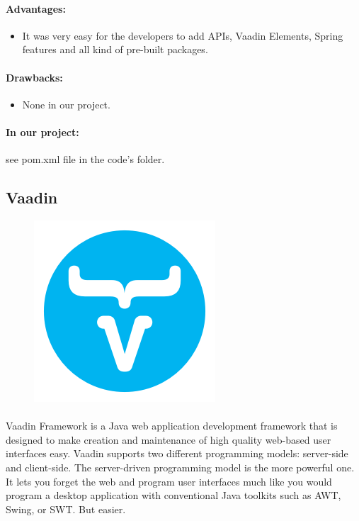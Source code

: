 \documentclass{article}
\begin{document}
		\paragraph{Advantages:}
		\begin{itemize}
			\item{}It was very easy for the developers to add APIs, Vaadin Elements, Spring features and all kind of pre-built packages.
		\end{itemize}
		\paragraph{Drawbacks:}
		\begin{itemize}
			\item{}None in our project.
		\end{itemize}
		\paragraph{In our project:}see pom.xml file in the code's folder.
	\subsection{Vaadin}
			\begin{figure}[H]
			\begin{center}
			\includegraphics[width=0.2\linewidth]{Images/Appendix/vaadin1.png}
			\label{fig:V1}
			\end{center}
			\end{figure}

			\paragraph{}Vaadin Framework is a Java web application development framework that is designed to make creation and maintenance of high quality web-based user interfaces easy. Vaadin supports two different programming models: server-side and client-side. The server-driven programming model is the more powerful one. It lets you forget the web and program user interfaces much like you would program a desktop application with conventional Java toolkits such as AWT, Swing, or SWT. But easier.\\
\end{document}
